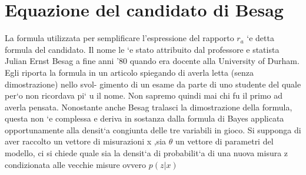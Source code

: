 \section{Equazione del candidato di Besag}
La formula utilizzata per semplificare l’espressione del rapporto $r_a$ `e detta formula
del candidato. Il nome le `e stato attribuito dal professore e statista Julian Ernst
Besag a fine anni ’80 quando era docente alla University of Durham. Egli riporta
la formula in un articolo spiegando di averla letta (senza dimostrazione) nello svol-
gimento di un esame da parte di uno studente del quale per`o non ricordava pi`
u il
nome. Non sapremo quindi mai chi fu il primo ad averla pensata. Nonostante anche
Besag tralasci la dimostrazione della formula, questa non `e complessa e deriva in
sostanza dalla formula di Bayes applicata opportunamente alla densit`a congiunta
delle tre variabili in gioco.
Si supponga di aver raccolto un vettore di misurazioni x ,sia $\theta$ un vettore di parametri
del modello, ci si chiede quale sia la densit`a di probabilit`a di una nuova misura z
condizionata alle vecchie misure ovvero $p(z|x)$

